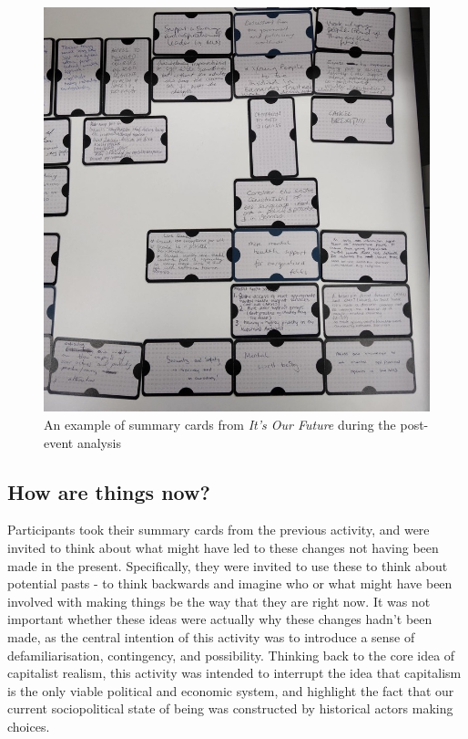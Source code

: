 \begin{figure}
    \centering
    \includegraphics[width=1\linewidth]{Images/7/summary-cards.jpeg}

    \caption{An example of summary cards from \textit{It's Our Future} during the post-event analysis}
    \label{fig:summary-cards}
\end{figure}
\subsection{How are things now?}
Participants took their summary cards from the previous activity, and were invited to think about what might have led to these changes not having been made in the present. Specifically, they were invited to use these to think about potential pasts - to think backwards and imagine who or what might have been involved with making things be the way that they are right now. It was not important whether these ideas were actually why these changes hadn't been made, as the central intention of this activity was to introduce a sense of defamiliarisation, contingency, and possibility. Thinking back to the core idea of capitalist realism, this activity was intended to interrupt the idea that capitalism is the only viable political and economic system, and highlight the fact that our current sociopolitical state of being was constructed by historical actors making choices.

